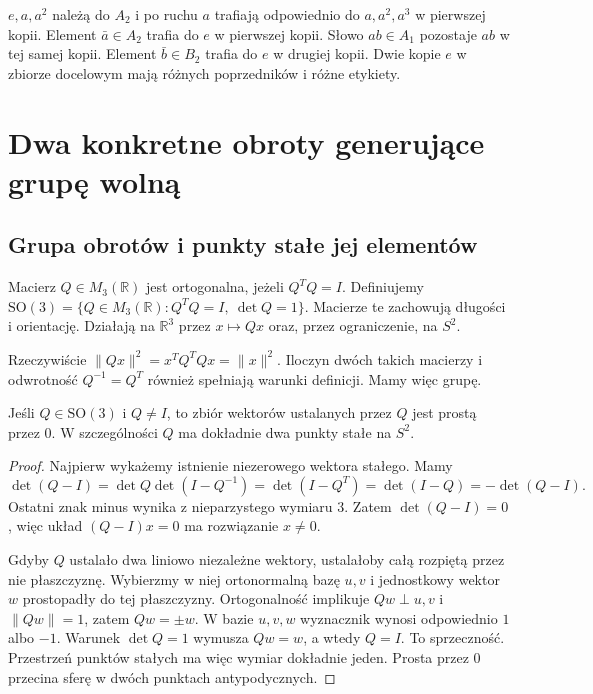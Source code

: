 \begin{przyklad}
$e,a,a^2$ należą do $A_2$ i po ruchu $a$ trafiają odpowiednio do $a,a^2,a^3$ w pierwszej kopii. Element $\bar a\in A_2$ trafia do $e$ w pierwszej kopii. Słowo $ab\in A_1$ pozostaje $ab$ w tej samej kopii. Element $\bar b\in B_2$ trafia do $e$ w drugiej kopii. Dwie kopie $e$ w zbiorze docelowym mają różnych poprzedników i różne etykiety.
\end{przyklad}

\section{Dwa konkretne obroty generujące grupę wolną}
\subsection{Grupa obrotów i punkty stałe jej elementów}\label{subsec:so3}
\begin{definicja}
Macierz $Q\in M_3(\mathbb R)$ jest ortogonalna, jeżeli $Q^TQ=I$. Definiujemy $\mathrm{SO}(3)=\{Q\in M_3(\mathbb R):Q^TQ=I,\ \det Q=1\}$. Macierze te zachowują długości i orientację. Działają na $\mathbb R^3$ przez $x\mapsto Qx$ oraz, przez ograniczenie, na $S^2$.
\end{definicja}
Rzeczywiście $\|Qx\|^2=x^TQ^TQx=\|x\|^2$. Iloczyn dwóch takich macierzy i odwrotność $Q^{-1}=Q^T$ również spełniają warunki definicji. Mamy więc grupę.
\begin{lemat}\label{lem:os-obrotu}
Jeśli $Q\in\mathrm{SO}(3)$ i $Q\ne I$, to zbiór wektorów ustalanych przez $Q$ jest prostą przez $0$. W szczególności $Q$ ma dokładnie dwa punkty stałe na $S^2$.
\end{lemat}
\begin{proof}
Najpierw wykażemy istnienie niezerowego wektora stałego. Mamy
\[
 \det(Q-I)=\det Q\det(I-Q^{-1})=\det(I-Q^T)
 =\det(I-Q)=-\det(Q-I).
\]
Ostatni znak minus wynika z nieparzystego wymiaru $3$. Zatem $\det(Q-I)=0$, więc układ $(Q-I)x=0$ ma rozwiązanie $x\ne0$.

Gdyby $Q$ ustalało dwa liniowo niezależne wektory, ustalałoby całą rozpiętą przez nie płaszczyznę. Wybierzmy w niej ortonormalną bazę $u,v$ i jednostkowy wektor $w$ prostopadły do tej płaszczyzny. Ortogonalność implikuje $Qw\perp u,v$ i $\|Qw\|=1$, zatem $Qw=\pm w$. W bazie $u,v,w$ wyznacznik wynosi odpowiednio $1$ albo $-1$. Warunek $\det Q=1$ wymusza $Qw=w$, a wtedy $Q=I$. To sprzeczność. Przestrzeń punktów stałych ma więc wymiar dokładnie jeden. Prosta przez $0$ przecina sferę w dwóch punktach antypodycznych.
\end{proof}
